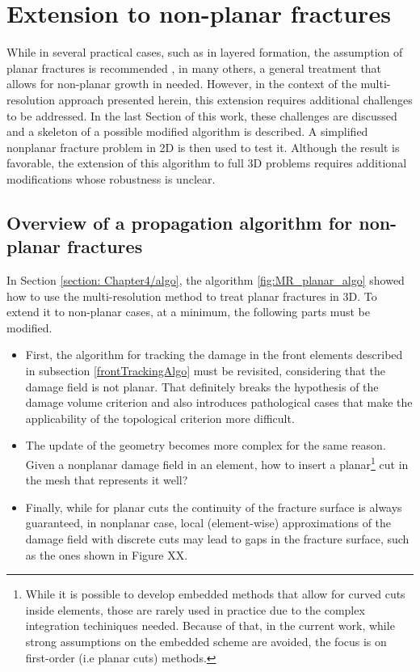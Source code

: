\section{Extension to non-planar fractures}
\label{section: Chapter4/nonplanar}

While in several practical cases, such as in layered formation, the assumption of planar fractures is recommended \cite{mcclure2020planar}, in many others, a general treatment that allows for non-planar growth in needed. However, in the context of the multi-resolution approach presented herein, this extension requires additional challenges to be addressed. In the last Section of this work, these challenges are discussed and a skeleton of a possible modified algorithm is described. A simplified nonplanar fracture problem in 2D is then used to test it. Although the result is favorable, the extension of this algorithm to full 3D problems requires additional modifications whose robustness is unclear. 

\subsection{Overview of a propagation algorithm for non-planar fractures}\label{basicNonplanarAlgo}

In Section \ref{section: Chapter4/algo}, the algorithm \ref{fig:MR_planar_algo} showed how to use the multi-resolution method to treat planar fractures in 3D. To extend it to non-planar cases, at a minimum, the following parts must be modified. 

\begin{itemize}
    \item First, the algorithm for tracking the damage in the front elements described in subsection \ref{frontTrackingAlgo} must be revisited, considering that the damage field is not planar. That definitely breaks the hypothesis of the damage volume criterion and also introduces pathological cases that make the applicability of the topological criterion more difficult.
    
    \item The update of the geometry becomes more complex for the same reason. Given a nonplanar damage field in an element, how to insert a planar\footnote{While it is possible to develop embedded methods that allow for curved cuts inside elements, those are rarely used in practice due to the complex integration techiniques needed. Because of that, in the current work, while strong assumptions on the embedded scheme are avoided, the focus is on first-order (i.e planar cuts) methods.} cut in the mesh that represents it well?
    
    \item Finally, while for planar cuts the continuity of the fracture surface is always guaranteed, in nonplanar case, local (element-wise) approximations of the damage field with discrete cuts may lead to gaps in the fracture surface, such as the ones shown in Figure XX.
\end{itemize}

